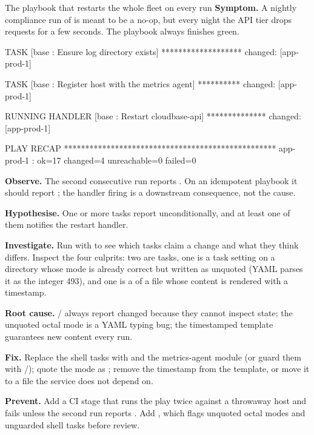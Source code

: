 \begin{debuglab}{The playbook that restarts the whole fleet on every run}
\textbf{Symptom.} A nightly compliance run of  is meant to be a no-op, but every night the API tier drops requests for a few seconds. The playbook always finishes green.

\begin{outbox}
TASK [base : Ensure log directory exists] *******************
changed: [app-prod-1]

TASK [base : Register host with the metrics agent] **********
changed: [app-prod-1]

RUNNING HANDLER [base : Restart cloudbase-api] **************
changed: [app-prod-1]

PLAY RECAP **************************************************
app-prod-1  : ok=17  changed=4  unreachable=0  failed=0
\end{outbox}

\begin{tickcheck}
  \item \textbf{Observe.} The second consecutive run reports . On an idempotent playbook it should report ; the handler firing is a downstream consequence, not the cause.
  \item \textbf{Hypothesise.} One or more tasks report  unconditionally, and at least one of them notifies the restart handler.
  \item \textbf{Investigate.} Run with  to see which tasks claim a change and what they think differs. Inspect the four culprits: two are  tasks, one is a  task setting  on a directory whose mode is already correct but written as  unquoted (YAML parses it as the integer 493), and one is a  of a file whose content is rendered with a timestamp.
  \item \textbf{Root cause.} / always report changed because they cannot inspect state; the unquoted octal mode is a YAML typing bug; the timestamped template guarantees new content every run.
  \item \textbf{Fix.} Replace the shell tasks with  and the metrics-agent module (or guard them with /); quote the mode as ; remove the timestamp from the template, or move it to a file the service does not depend on.
  \item \textbf{Prevent.} Add a CI stage that runs the play twice against a throwaway host and fails unless the second run reports . Add , which flags unquoted octal modes and unguarded shell tasks before review.
\end{tickcheck}
\end{debuglab}

